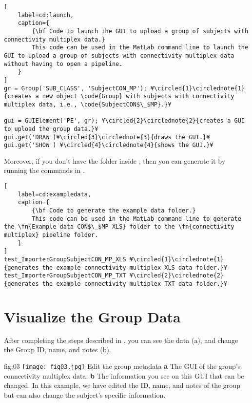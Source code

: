 \documentclass[justified]{tufte-handout}
\begin{document}
%
\begin{lstlisting}[
	label=cd:launch,
	caption={
		{\bf Code to launch the GUI to upload a group of subjects with connectivity multiplex data.}
		This code can be used in the MatLab command line to launch the GUI to upload a group of subjects with connectivity multiplex data without having to open a pipeline.
	}
]
gr = Group('SUB_CLASS', 'SubjectCON_MP'); ¥\circled{1}\circlednote{1}{creates a new object \code{Group} with subjects with connectivity multiplex data, i.e., \code{SubjectCON$\_$MP}.}¥

gui = GUIElement('PE', gr); ¥\circled{2}\circlednote{2}{creates a GUI to upload the group data.}¥
gui.get('DRAW')¥\circled{3}\circlednote{3}{draws the GUI.}¥
gui.get('SHOW') ¥\circled{4}\circlednote{4}{shows the GUI.}¥
\end{lstlisting}

Moreover, if you don't have the  folder inside , then you can generate it by running the commands in .

\begin{lstlisting}[
	label=cd:exampledata,
	caption={
		{\bf Code to generate the example data folder.}
		This code can be used in the MatLab command line to generate the \fn{Example data CON$\_$MP XLS} folder to the \fn{connectivity multiplex} pipeline folder.
	}
]
test_ImporterGroupSubjectCON_MP_XLS ¥\circled{1}\circlednote{1}{generates the example connectivity multiplex XLS data folder.}¥
test_ImporterGroupSubjectCON_MP_TXT ¥\circled{2}\circlednote{2}{generates the example connectivity multiplex TXT data folder.}¥
\end{lstlisting}

\section{Visualize the Group Data}

After completing the steps described in , you can see the data (a), and change the Group ID, name, and notes (b). 

	{fig:03}
	{
	\texttt{[image: fig03.jpg]}
	}
	{Edit the group metadata}
	{ 
	{\bf a} The GUI of the group's connectivity multiplex data. 
	{\bf b} The information you see on this GUI that can be changed. In this example, we have edited the ID, name, and notes of the group but can also change the subject's specific information.
	}
\end{document}
